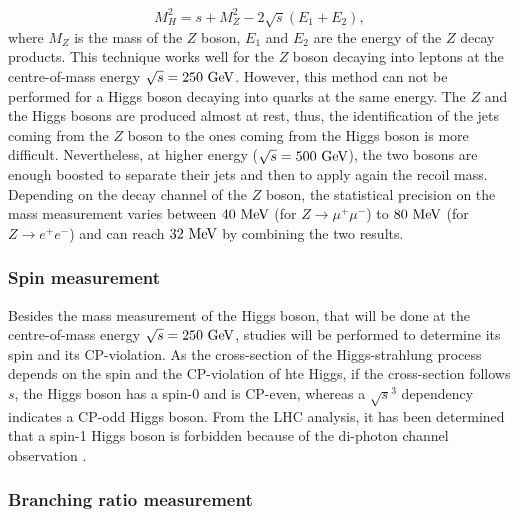     \begin{equation}
      M^2_H = s + M^2_Z - 2 \sqrt{s}\left(E_{1} + E_{2}\right),
    \end{equation}
    where $M_Z$ is the mass of the $Z$ boson, $E_1$ and $E_2$ are the energy of the $Z$ decay products. 
    This technique works well for the $Z$ boson decaying into leptons at the centre-of-mass energy $\sqrt{s} = 250~\rm{GeV}$.
    However, this method can not be performed for a Higgs boson decaying into quarks at the same energy. 
    The $Z$ and the Higgs bosons are produced almost at rest, thus, the identification of the jets coming from the $Z$ boson to the ones coming from the Higgs boson is more difficult.
    Nevertheless, at higher energy ($\sqrt{s} = 500~\rm{GeV}$), the two bosons are enough boosted to separate their jets and then to apply again the recoil mass.
    Depending on the decay channel of the $Z$ boson, the statistical precision on the mass measurement varies between $40~\rm{MeV}$ (for $Z \rightarrow \mu^+\mu^-$) to $80~\rm{MeV}$ (for $Z \rightarrow e^+e^-$) and can reach $32~\rm{MeV}$ by combining the two results.
    
    \subsubsection{Spin measurement}

    Besides the mass measurement of the Higgs boson, that will be done at the centre-of-mass energy $\sqrt{s} = 250~\rm{GeV}$, studies will be performed to determine its spin and its CP-violation.
    As the cross-section of the Higgs-strahlung process depends on the spin and the CP-violation of hte Higgs, if the cross-section follows $s$, the Higgs boson has a spin-0 and is CP-even, whereas a $\sqrt{s}^3$ dependency indicates a CP-odd Higgs boson.
    From the \gls{LHC} analysis, it has been determined that a spin-1 Higgs boson is forbidden because of the di-photon channel observation \cite{TheATLASCollaboration2013}.

    \subsubsection{Branching ratio measurement}

